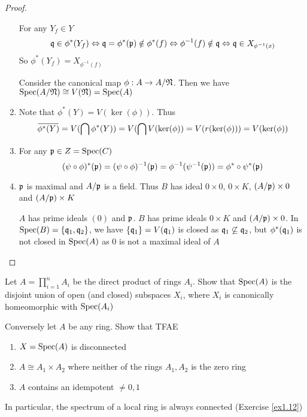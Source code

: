 \documentclass[11pt]{article}
\begin{document}
\begin{proof}
\begin{enumerate}
For any \(Y_f\in Y\)
\begin{equation*}
\mathfrak{q}\in\phi^*(Y_f)\Leftrightarrow\mathfrak{q}=\phi^*(\mathfrak{p})\notin\phi^*(f)\Leftrightarrow \phi^{-1}(f)\notin\mathfrak{q}\Leftrightarrow\mathfrak{q}\in X_{\phi^{-1}(x)}
\end{equation*}
So \(\phi^*(Y_f)=X_{\phi^{-1}(f)}\)

Consider the canonical map \(\phi:A\to A/\mathfrak{N}\). Then we have \(\operatorname{Spec}(A/\mathfrak{N})\cong V(\mathfrak{N})=\operatorname{Spec}(A)\)
\item Note that \(\phi^*(Y)=V(\ker(\phi))\). Thus
\begin{equation*}
\bbar{\phi^*(Y)}=V(\bigcap\phi^*(Y))=V(\bigcap V(\ker(\phi))=V(r(\ker(\phi)))=V(\ker(\phi))
\end{equation*}
\item For any \(\mathfrak{p}\in Z=\operatorname{Spec}(C)\)
\begin{equation*}
(\psi\circ\phi)^*(\mathfrak{p})=(\psi\circ\phi)^{-1}(\mathfrak{p})=\phi^{-1}(\psi^{-1}(\mathfrak{p}))=\phi^*\circ\psi^*(\mathfrak{p})
\end{equation*}
\item \(\mathfrak{p}\) is maximal and \(A/\mathfrak{p}\) is a field. Thus \(B\) has
ideal \(0\times 0\), \(0\times K\), \((A/\mathfrak{p})\times 0\) and \((A/\mathfrak{p})\times K\)

\(A\) has prime ideals \((0)\) and \(\mathfrak{p}\). \(B\) has prime ideals \(0\times K\) and \((A/\mathfrak{p})\times 0\).
In \(\operatorname{Spec}(B)=\{\mathfrak{q}_1,\mathfrak{q}_2\}\), we have \(\{\mathfrak{q}_1\}=V(\mathfrak{q}_1)\) is closed as \(\mathfrak{q}_1\not\subseteq\mathfrak{q}_2\), but \(\phi^*(\mathfrak{q}_1)\)
is not closed in \(\operatorname{Spec}(A)\) as \(0\) is not a maximal ideal of \(A\)
\end{enumerate}
\end{proof}

\begin{exercise}
\label{ex1.22}
Let \(A=\prod_{i=1}^nA_i\) be the direct product of rings \(A_i\). Show that \(\operatorname{Spec}(A)\) is the
disjoint union of open (and closed) subspaces \(X_i\), where \(X_i\) is canonically homeomorphic
with \(\operatorname{Spec}(A_i)\)

Conversely let \(A\) be any ring. Show that TFAE
\begin{enumerate}
\item \(X=\operatorname{Spec}(A)\) is disconnected
\item \(A\cong A_1\times A_2\) where neither of the rings \(A_1,A_2\) is the zero ring
\item \(A\) contains an idempotent \(\neq 0,1\)
\end{enumerate}


In particular, the spectrum of a local ring is always connected (Exercise \ref{ex1.12})
\end{exercise}
\end{document}
